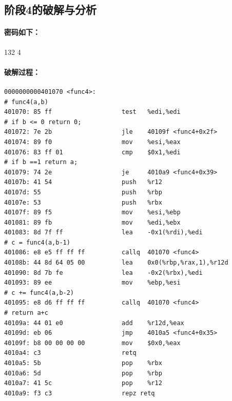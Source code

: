 \subsection{阶段4的破解与分析}

\paragraph{密码如下：}132 4

\paragraph{破解过程：}

\begin{lstlisting}
0000000000401070 <func4>:
# func4(a,b)
401070:	85 ff                	test   %edi,%edi
# if b <= 0 return 0;
401072:	7e 2b                	jle    40109f <func4+0x2f>
401074:	89 f0                	mov    %esi,%eax
401076:	83 ff 01             	cmp    $0x1,%edi
# if b ==1 return a;
401079:	74 2e                	je     4010a9 <func4+0x39>
40107b:	41 54                	push   %r12
40107d:	55                   	push   %rbp
40107e:	53                   	push   %rbx
40107f:	89 f5                	mov    %esi,%ebp
401081:	89 fb                	mov    %edi,%ebx
401083:	8d 7f ff             	lea    -0x1(%rdi),%edi
# c = func4(a,b-1)
401086:	e8 e5 ff ff ff       	callq  401070 <func4>
40108b:	44 8d 64 05 00       	lea    0x0(%rbp,%rax,1),%r12d
401090:	8d 7b fe             	lea    -0x2(%rbx),%edi
401093:	89 ee                	mov    %ebp,%esi
# c += func4(a,b-2)
401095:	e8 d6 ff ff ff       	callq  401070 <func4>
# return a+c
40109a:	44 01 e0             	add    %r12d,%eax
40109d:	eb 06                	jmp    4010a5 <func4+0x35>
40109f:	b8 00 00 00 00       	mov    $0x0,%eax
4010a4:	c3                   	retq   
4010a5:	5b                   	pop    %rbx
4010a6:	5d                   	pop    %rbp
4010a7:	41 5c                	pop    %r12
4010a9:	f3 c3                	repz retq 


\end{lstlisting}
